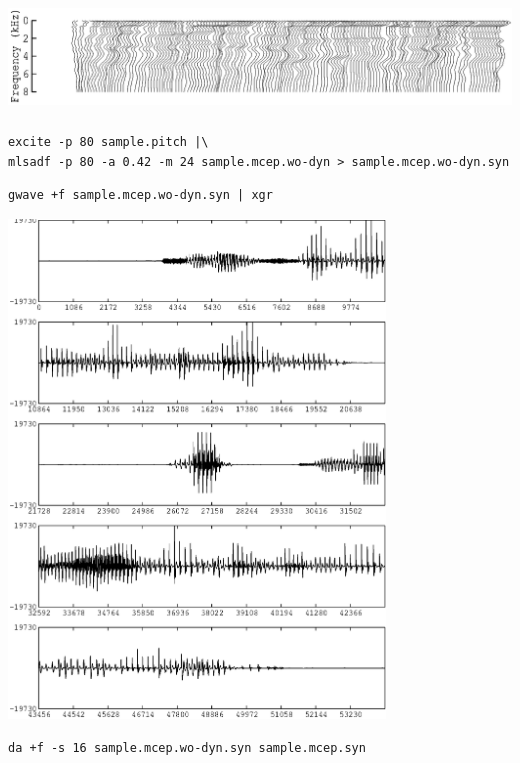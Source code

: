 \documentclass[a4paper,10pt]{article}
\begin{document}
\includegraphics[height=3cm]{eps/sample.mcep.wo-dyn.grlogsp-t.eps}

\begin{verbatim}
excite -p 80 sample.pitch |\
mlsadf -p 80 -a 0.42 -m 24 sample.mcep.wo-dyn > sample.mcep.wo-dyn.syn
\end{verbatim}

\begin{verbatim}
gwave +f sample.mcep.wo-dyn.syn | xgr
\end{verbatim}

\includegraphics[width=10cm]{eps/sample.mcep.wo-dyn.syn.gwave.eps}

\begin{verbatim}
da +f -s 16 sample.mcep.wo-dyn.syn sample.mcep.syn
\end{verbatim}
\end{document}
